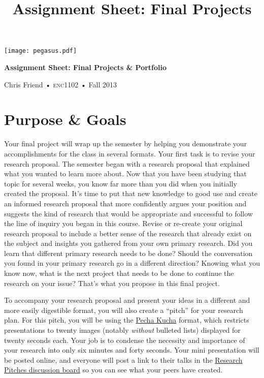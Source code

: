 \documentclass[10pt,oneside]{amsart}	%
\title[Final Projects]{Assignment Sheet: Final Projects}
\begin{document}
%
\thispagestyle{empty}

\vspace{-2in}
\begin{center}
\huge
{\texttt{[image: pegasus.pdf]}}

\textbf{Assignment Sheet: Final Projects \& Portfolio}

{\normalsize Chris Friend • \textsc{enc1102} • Fall 2013}
\end{center}
\vspace{1.5\baselineskip}

\section{Purpose \& Goals} %
\label{sec:purpose}
Your final project will wrap up the semester by helping you demonstrate your accomplishments for the class in several formats. Your first task is to revise your research proposal. The semester began with a research proposal that explained what you wanted to learn more about. Now that you have been studying that topic for several weeks, you know far more than you did when you initially created the proposal. It's time to put that new knowledge to good use and create an informed research proposal that more confidently argues your position and suggests the kind of research that would be appropriate and successful to follow the line of inquiry you began in this course. Revise or re-create your original research proposal to include a better sense of the research that already exist on the subject and insights you gathered from your own primary research. Did you learn that different primary research needs to be done? Should the conversation you found in your primary research go in a different direction? Knowing what you know now, what is the next project that needs to be done to continue the research on your issue? That's what you propose in this final project.

To accompany your research proposal and present your ideas in a different and more easily digestible format, you will also create a ``pitch'' for your research plan. For this pitch, you will be using the \href{http://www.pechakucha.org}{Pecha Kucha} format, which restricts presentations to twenty images (notably \emph{without} bulleted lists) displayed for twenty seconds each. Your job is to condense the necessity and importance of your research into only six minutes and forty seconds. Your mini presentation will be posted online, and everyone will post a link to their talks in the \href{https://webcourses2c.instructure.com/courses/982699/discussion_topics/1903125}{Research Pitches discussion board} so you can see what your peers have created.
\end{document}
